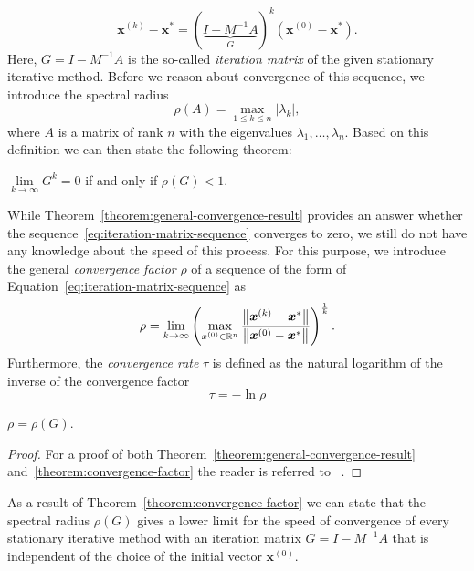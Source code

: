\begin{equation}
	\bm{x}^{(k)} - \bm{x}^{*} = (\underbrace{I - M^{-1} A}_{G})^k (\bm{x}^{(0)} - \bm{x}^{*}).
	\label{eq:iteration-matrix-sequence}
\end{equation}
Here, $G = I - M^{-1} A$ is the so-called \emph{iteration matrix} of the given stationary iterative method.
Before we reason about convergence of this sequence, we introduce the spectral radius 
\begin{equation}
	\rho (A)=\max \limits_{1 \leq k \leq n} |\lambda _{k}|,
\end{equation}
where $A$ is a matrix of rank $n$ with the eigenvalues $\lambda_{1}, \dots, \lambda_{n}$.
Based on this definition we can then state the following theorem:
\begin{theorem}
$\lim \limits_{k \to  \infty} G^k = 0$ if and only if $\rho(G) < 1$.
\label{theorem:general-convergence-result}
\end{theorem}

While Theorem~\ref{theorem:general-convergence-result} provides an answer whether the sequence~\eqref{eq:iteration-matrix-sequence} converges to zero, we still do not have any knowledge about the speed of this process.
For this purpose, we introduce the general \emph{convergence factor} $\rho$ of a sequence of the form of Equation~\eqref{eq:iteration-matrix-sequence} as
\begin{equation}
	\rho = \lim \limits_{k \to  \infty} \left( \max \limits_{x^{(0)} \in \mathbb{R}^{n}} \frac{\norm{\bm{x}^{(k)} - \bm{x}^{*}}}{\norm{\bm{x}^{(0)} - \bm{x}^{*}}} \right)^{\frac{1}{k}}.
\end{equation} 
Furthermore, the \emph{convergence rate} $\tau$ is defined as the natural logarithm of the inverse of the convergence factor
\begin{equation}
	\tau = -\ln \rho
\end{equation}
\begin{theorem}
	$\rho = \rho(G)$.
	\label{theorem:convergence-factor}
\end{theorem}
\begin{proof}
	For a proof of both Theorem~\ref{theorem:general-convergence-result} and~\ref{theorem:convergence-factor} the reader is referred to ~\cite{varga1962iterative,saad2003iterative}.
\end{proof}
As a result of Theorem~\ref{theorem:convergence-factor} we can state that the spectral radius $\rho(G)$ gives a lower limit for the speed of convergence of every stationary iterative method with an iteration matrix $G = I - M^{-1} A$ that is independent of the choice of the initial vector $\bm{x}^{(0)}$. 




